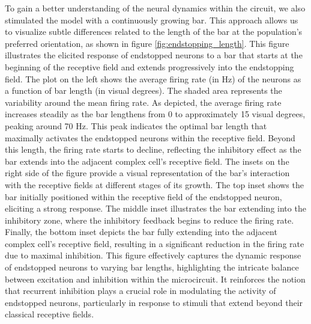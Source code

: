 \documentclass[12pt]{article}
\begin{document}
To gain a better understanding of the neural dynamics within the circuit, we also stimulated the model with a continuously growing bar. This approach allows us to visualize subtle differences related to the length of the bar at the population's preferred orientation, as shown in figure \ref{fig:endstopping_length}. This figure illustrates the elicited response of endstopped neurons to a bar that starts at the beginning of the receptive field and extends progressively into the endstopping field. The plot on the left shows the average firing rate (in Hz) of the neurons as a function of bar length (in visual degrees). The shaded area represents the variability around the mean firing rate. As depicted, the average firing rate increases steadily as the bar lengthens from 0 to approximately 15 visual degrees, peaking around 70 Hz. This peak indicates the optimal bar length that maximally activates the endstopped neurons within the receptive field. Beyond this length, the firing rate starts to decline, reflecting the inhibitory effect as the bar extends into the adjacent complex cell's receptive field.
\bigbreak
The insets on the right side of the figure provide a visual representation of the bar's interaction with the receptive fields at different stages of its growth. The top inset shows the bar initially positioned within the receptive field of the endstopped neuron, eliciting a strong response. The middle inset illustrates the bar extending into the inhibitory zone, where the inhibitory feedback begins to reduce the firing rate. Finally, the bottom inset depicts the bar fully extending into the adjacent complex cell's receptive field, resulting in a significant reduction in the firing rate due to maximal inhibition. This figure effectively captures the dynamic response of endstopped neurons to varying bar lengths, highlighting the intricate balance between excitation and inhibition within the microcircuit. It reinforces the notion that recurrent inhibition plays a crucial role in modulating the activity of endstopped neurons, particularly in response to stimuli that extend beyond their classical receptive fields.
\end{document}
